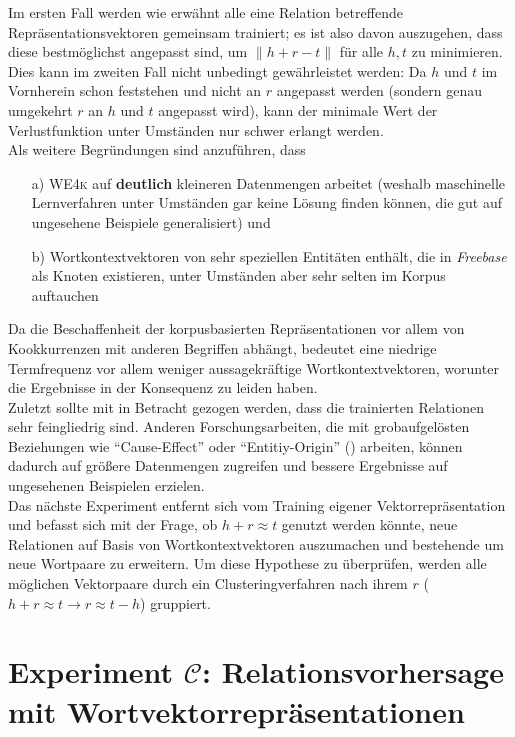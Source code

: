 Im ersten Fall werden wie erwähnt alle eine Relation betreffende Repräsentationsvektoren gemeinsam trainiert; es ist
also davon auszugehen, dass diese bestmöglichst angepasst sind, um $\parallel h + r - t\parallel$ für alle $h, t$ zu minimieren.\\
Dies kann im zweiten Fall nicht unbedingt gewährleistet werden: Da $h$ und $t$ im Vornherein schon feststehen und nicht
an $r$ angepasst werden (sondern genau umgekehrt $r$ an $h$ und $t$ angepasst wird), kann der minimale Wert der Verlustfunktion
unter Umständen nur schwer erlangt werden.\\
Als weitere Begründungen sind anzuführen, dass
\begin{itemize}
 \item[a)] \textsc{WE4k} auf \textbf{deutlich} kleineren Datenmengen arbeitet (weshalb maschinelle
  Lernverfahren unter Umständen gar keine Lösung finden können, die gut auf ungesehene Beispiele generalisiert) und
  \item[b)] Wortkontextvektoren von sehr speziellen Entitäten enthält, die in \emph{Freebase} als Knoten existieren,
  unter Umständen aber sehr selten im Korpus auftauchen
\end{itemize}
Da die Beschaffenheit der korpusbasierten Repräsentationen vor allem von Kookkurrenzen mit anderen
Begriffen abhängt, bedeutet eine niedrige Termfrequenz vor allem weniger aussagekräftige Wortkontextvektoren, worunter die
Ergebnisse in der Konsequenz zu leiden haben.\\

Zuletzt sollte mit in Betracht gezogen werden, dass die trainierten Relationen sehr feingliedrig sind. Anderen Forschungsarbeiten,
 die mit grobaufgelösten Beziehungen wie ``Cause-Effect'' oder ``Entitiy-Origin''
(\cite{hendrickx2009semeval}) arbeiten, können dadurch auf größere Datenmengen zugreifen und bessere Ergebnisse auf
ungesehenen Beispielen erzielen.\\

Das nächste Experiment entfernt sich vom Training eigener Vektorrepräsentation und befasst sich mit der Frage, ob
$h + r \approx t$ genutzt werden könnte, neue Relationen auf Basis von Wortkontextvektoren auszumachen und bestehende um
 neue Wortpaare zu erweitern. Um diese Hypothese zu überprüfen, werden alle möglichen Vektorpaare durch ein
 Clusteringverfahren nach ihrem $r$ ($h + r \approx t \rightarrow r \approx t - h$) gruppiert.

\section{Experiment $\mathcal{C}$: Relationsvorhersage mit Wortvektorrepräsentationen}\label{sec:exp-c}

